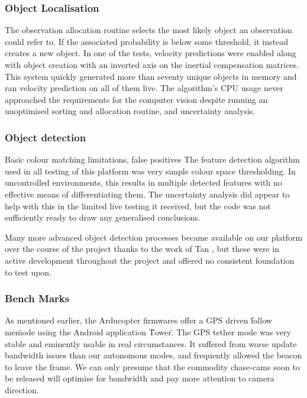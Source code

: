 \documentclass[a4paper, 11pt, titlepage]{article}
\begin{document}
    \subsubsection{Object Localisation}
      The observation allocation routine selects the most likely object an observation could refer to. If the associated probability is below some threshold, it instead creates a new object.
      In one of the tests, velocity predictions were enabled along with object creation with an inverted axis on the inertial compensation matrices. This system quickly generated more than seventy unique objects in memory and ran velocity prediction on all of them live. The algorithm's CPU usage never approached the requirements for the computer vision despite running an unoptimised sorting and allocation routine, and uncertainty analysis.


    \subsubsection{Object detection}
      Basic colour matching limitations, false positives
      The feature detection algorithm used in all testing of this platform was very simple colour space thresholding.  In uncontrolled environments, this results in multiple detected features with no effective means of differentiating them.  The uncertainty analysis did appear to help with this in the limited live testing it received, but the code was not sufficiently ready to draw any generalised conclusions.

      Many more advanced object detection processes became available on our platform over the course of the project thanks to the work of Tan \cite{Tan}, but these were in active development throughout the project and offered no consistent foundation to test upon.

    \subsubsection{Bench Marks}
      As mentioned earlier, the Arducopter firmwares offer a GPS driven \"follow me\" mode using the Android application \"Tower\".
      The GPS tether mode was very stable and eminently usable in real circumstances.  It suffered from worse update bandwidth issues than our autonomous modes, and frequently allowed the beacon to leave the frame.  We can only presume that the commodity chase-cams soon to be released will optimise for bandwidth and pay more attention to camera direction.
\end{document}
